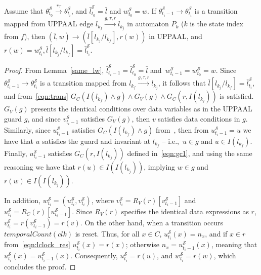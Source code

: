 \begin{proposition}
\label{p3_transition}
Assume that $\theta^\mathcal{S}_{t_0}\xrightarrow{*\tau}\theta^\mathcal{S}_{t_i}$, and $\bar{l}^\mathcal{S}_{t_0}=\bar{l}$ and $w^\mathcal{S}_{t_0}=w$. If $\theta^\mathcal{S}_{t_i-1}\rightarrow \theta^\mathcal{S}_{t_i}$ is a transition mapped from UPPAAL edge $l_{k_f} \xrightarrow{g,\tau,r} l_{k_j}$ in automaton $P_k$ ($k$ is the state index from $f$), then $(\bar{l},w)\rightarrow (\bar{l}[l_{k_j}/l_{k_f}],r(w))$ in UPPAAL, and $r(w)=w^{\mathcal{S}}_{t_i}, \bar{l}[l_{k_j}/l_{k_f}]=\bar{l}^\mathcal{S}_{t_i}$.
\end{proposition}


\begin{proof}
From Lemma~\ref{same_lw}, $\bar{l}^\mathcal{S}_{t_i-1}=\bar{l}^\mathcal{S}_{t_0}=\bar{l}$ and~$w^\mathcal{S}_{t_i-1}=w^\mathcal{S}_{t_0}=w$. Since $\theta^\mathcal{S}_{t_i-1}\rightarrow\theta^\mathcal{S}_{t_i}$ is a transition mapped from $l_{k_f} \xrightarrow{g,\tau,r} l_{k_j}$, it follows that $\bar{l}[l_{k_j}/l_{k_f}]=\bar{l}^\mathcal{S}_{t_i}$, and from~\eqref{eqn:trans} $G_C(I(l_{k_f})\wedge g) \wedge G_V(g) \wedge G_C(r,I(l_{k_j}))$ is satisfied. $G_V(g)$ presents the identical conditions over data variables as in the UPPAAL guard $g$, and since $v^{\mathcal{S}}_{t_i-1}$ satisfies $G_V(g)$, then $v$ satisfies data conditions in $g$. Similarly, since $u^\mathcal{S}_{t_i-1}$ satisfies $G_C(I(l_{k_f})\wedge g)$ from~, then from $u^\mathcal{S}_{t_i-1}=u$ we have that $u$ satisfies the guard and invariant at $l_{k_f}$ -- i.e.,~$u\in g$ and $u\in I(l_{k_f})$. 
Finally, $u^\mathcal{S}_{t_i-1}$ satisfies $G_C(r,I(l_{k_j}))$ defined in~\eqref{eqn:gc1}, and using the same reasoning we have that $r(u)\in I(I(l_{k_j}))$, implying $w\in g$ and $r(w)\in I(I(l_{k_j}))$. 

In addition, $w^{\mathcal{S}}_{t_i}=(u^{\mathcal{S}}_{t_i},v^{\mathcal{S}}_{t_i})$, where $v^{\mathcal{S}}_{t_i}=R_V(r)[v^{\mathcal{S}}_{t_i-1}]$ and $u^{\mathcal{S}}_{t_i}=R_C(r)[u^{\mathcal{S}}_{t_i-1}]$. Since $R_V(r)$ specifies the identical data expressions as $r$, $v^{\mathcal{S}}_{t_i}=r(v^{\mathcal{S}}_{t_i-1})=r(v)$. On the other hand, when a transition occurs $temporalCount(clk)$ is reset. Thus, for all $x\in C$, $u^{\mathcal{S}}_{t_i}(x)=n_x$, and if $x\in r$ from~\eqref{eqn:lclock_res} $u^{\mathcal{S}}_{t_i}(x)=r(x)$; otherwise $n_x=u^{\mathcal{S}}_{t_i-1}(x)$, meaning that $u^{\mathcal{S}}_{t_i}(x)=u^{\mathcal{S}}_{t_i-1}(x)$. Consequently, $u^{\mathcal{S}}_{t_i}=r(u)$, and $w^{\mathcal{S}}_{t_i}=r(w)$, which concludes the proof. 
\end{proof}
 
